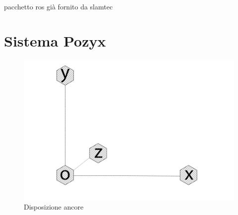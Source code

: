 pacchetto ros gi\`a fornito da slamtec

\section{Sistema Pozyx}
\label{sez:Sistema Pozyx}

\begin{figure}[h]
	\centering
	\includegraphics[height=0.2\textheight]{uwb_axis.png}
	\caption{Disposizione ancore}
	\label{fig: disposizione ancore}
\end{figure}


